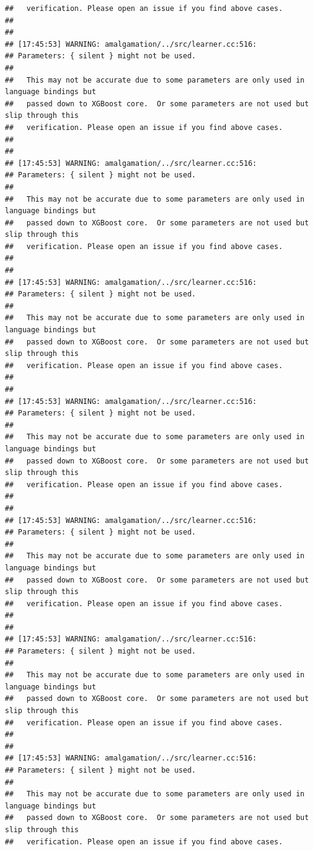 \documentclass[AMS,STIX2COL]{WileyNJD-v2}\usepackage[]{graphicx}\usepackage[]{color}
\makeatletter
\newenvironment{kframe}{%
 \def\at@end@of@kframe{}%
 \ifinner\ifhmode%
  \def\at@end@of@kframe{\end{minipage}}%
  \begin{minipage}{\columnwidth}%
 \fi\fi%
 \def\FrameCommand##1{\hskip\@totalleftmargin \hskip-\fboxsep
 \colorbox{shadecolor}{##1}\hskip-\fboxsep
     \hskip-\linewidth \hskip-\@totalleftmargin \hskip\columnwidth}%
 \MakeFramed {\advance\hsize-\width
   \@totalleftmargin\z@ \linewidth\hsize
   \@setminipage}}%
 {\par\unskip\endMakeFramed%
 \at@end@of@kframe}
\newenvironment{knitrout}{}{} %
\makeatother
\begin{document}
\begin{knitrout}
\begin{kframe}
\begin{verbatim}
##   verification. Please open an issue if you find above cases.
## 
## 
## [17:45:53] WARNING: amalgamation/../src/learner.cc:516: 
## Parameters: { silent } might not be used.
## 
##   This may not be accurate due to some parameters are only used in language bindings but
##   passed down to XGBoost core.  Or some parameters are not used but slip through this
##   verification. Please open an issue if you find above cases.
## 
## 
## [17:45:53] WARNING: amalgamation/../src/learner.cc:516: 
## Parameters: { silent } might not be used.
## 
##   This may not be accurate due to some parameters are only used in language bindings but
##   passed down to XGBoost core.  Or some parameters are not used but slip through this
##   verification. Please open an issue if you find above cases.
## 
## 
## [17:45:53] WARNING: amalgamation/../src/learner.cc:516: 
## Parameters: { silent } might not be used.
## 
##   This may not be accurate due to some parameters are only used in language bindings but
##   passed down to XGBoost core.  Or some parameters are not used but slip through this
##   verification. Please open an issue if you find above cases.
## 
## 
## [17:45:53] WARNING: amalgamation/../src/learner.cc:516: 
## Parameters: { silent } might not be used.
## 
##   This may not be accurate due to some parameters are only used in language bindings but
##   passed down to XGBoost core.  Or some parameters are not used but slip through this
##   verification. Please open an issue if you find above cases.
## 
## 
## [17:45:53] WARNING: amalgamation/../src/learner.cc:516: 
## Parameters: { silent } might not be used.
## 
##   This may not be accurate due to some parameters are only used in language bindings but
##   passed down to XGBoost core.  Or some parameters are not used but slip through this
##   verification. Please open an issue if you find above cases.
## 
## 
## [17:45:53] WARNING: amalgamation/../src/learner.cc:516: 
## Parameters: { silent } might not be used.
## 
##   This may not be accurate due to some parameters are only used in language bindings but
##   passed down to XGBoost core.  Or some parameters are not used but slip through this
##   verification. Please open an issue if you find above cases.
## 
## 
## [17:45:53] WARNING: amalgamation/../src/learner.cc:516: 
## Parameters: { silent } might not be used.
## 
##   This may not be accurate due to some parameters are only used in language bindings but
##   passed down to XGBoost core.  Or some parameters are not used but slip through this
##   verification. Please open an issue if you find above cases.

\end{verbatim}
\end{kframe}
\end{knitrout}
\end{document}
